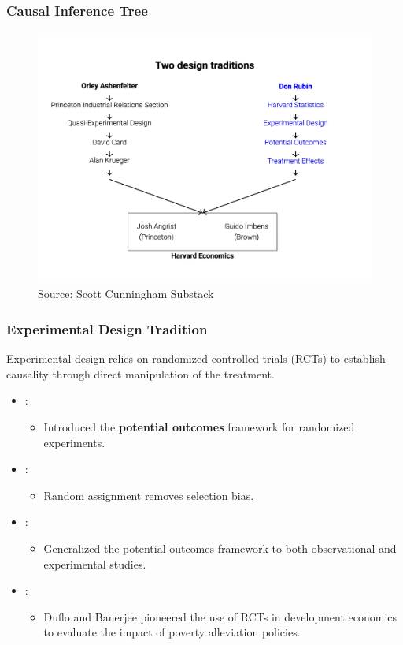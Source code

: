 \documentclass[xcolor=svgnames,t]{beamer}
\begin{document}
\begin{frame}
    \frametitle{Causal Inference Tree}
    \begin{figure}
        \includegraphics[width=0.8\linewidth]{Figures/CI_tree.jpg}
        \caption{Source: Scott Cunningham Substack}
    \end{figure}
\end{frame}

\begin{frame}
    \frametitle{Experimental Design Tradition}
    
    Experimental design relies on randomized controlled trials (RCTs) to establish causality through direct manipulation of the treatment.

    \begin{itemize}
        \item \cite{neyman1923}: 
        \begin{itemize}
         \item Introduced the \textbf{potential outcomes} framework for randomized experiments.
        \end{itemize}
        
        \pause
        \item \cite{fisher1935}: 
        \begin{itemize}
            \item Random assignment removes selection bias.
        \end{itemize}
        
        \pause
        \item \cite{rubin1974}: 
        \begin{itemize}
            \item Generalized the potential outcomes framework to both observational and experimental studies.
        \end{itemize}
        
        \pause
        \item \cite{banerjee2011}: 
        \begin{itemize}
            \item Duflo and Banerjee pioneered the use of RCTs in development economics to evaluate the impact of poverty alleviation policies.
    \end{itemize}
    \end{itemize}
\end{frame}
\end{document}
